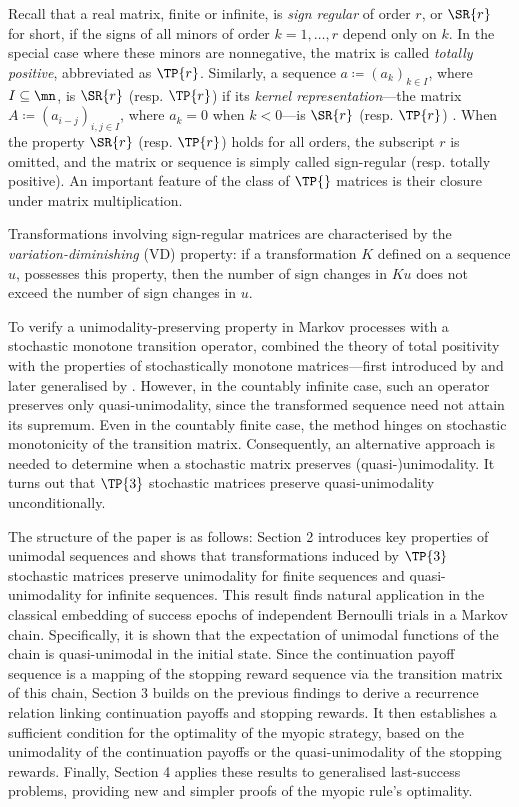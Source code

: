 \documentclass[11pt]{article}
\begin{document}
	Recall that a real matrix, finite or infinite, is   \textit{sign regular} of order $r$,  or $\SR{r}$ for short, if the signs of all minors of order $k=1,\ldots, r$ depend only on $k$. In the special case where these minors are nonnegative, the matrix is called   \textit{totally positive},  abbreviated as $\TP{r}$. Similarly, a sequence  $a \coloneqq (a_k)_{k \in I}$, where  $I  \subseteq \mn$,  is  $\SR{r}$ (resp. $\TP{r}$)  if its \textit{kernel representation}---the matrix $A\coloneqq(a_{i-j})_{i,j \in I}$, where $a_k = 0$ when $k < 0$---is  $\SR{r}$ (resp. $\TP{r}$)  \cite{KarlinTPBook}. 
	When the property $\SR{r}$ (resp. $\TP{r}$) holds for all orders, the subscript $r$ is omitted, and the matrix or sequence is simply called sign-regular (resp. totally positive).  An important feature of the class of \( \TP{} \) matrices is their closure under matrix multiplication. 
	
	
	Transformations involving sign-regular matrices are characterised by the \textit{variation-diminishing} (VD) property: if a transformation $K$ defined on a sequence $u$, possesses this property, then the number of sign changes in  $Ku$  does not exceed the 
	number of sign changes in $u$. 
	
	To verify a unimodality-preserving property in  Markov processes with a stochastic monotone transition operator,   \cite{KeilsonKester} combined  the theory of total positivity with the properties of stochastically monotone matrices---first introduced by \cite{Kalmykov} and later generalised by \cite{Daley}. However, in the countably infinite case, such an operator preserves only quasi-unimodality, since the transformed sequence need not  attain its supremum.  Even in the countably finite case, the method hinges on  stochastic monotonicity of the transition matrix. Consequently, an alternative approach is needed to determine when a stochastic matrix preserves (quasi-)unimodality. It turns out that $\TP{3}$  stochastic matrices preserve quasi-unimodality unconditionally. 
	
	
	The structure of the paper is as follows: Section 2 introduces key properties of unimodal sequences and shows that transformations induced by  
	$\TP{3}$ stochastic matrices preserve unimodality for finite sequences and quasi-unimodality for infinite sequences. This result finds natural application in the classical embedding of success epochs of independent Bernoulli trials in a Markov chain. Specifically, it is shown that the expectation of unimodal functions of the chain is quasi-unimodal in the initial state. 	Since the continuation payoff sequence is a mapping of the stopping reward sequence via the transition matrix of this chain, 
	Section 3 builds on the previous findings to derive a recurrence relation linking continuation payoffs and stopping rewards. It then establishes a sufficient condition for the optimality of the myopic strategy, based on the unimodality of the continuation payoffs or the quasi-unimodality of the stopping rewards. Finally, Section 4 applies these results to generalised last-success problems, providing new and simpler proofs of the myopic rule's optimality.
	
\end{document}
